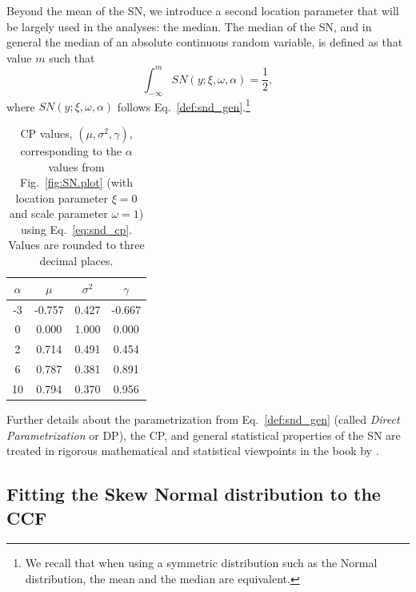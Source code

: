 \documentclass[11pt, oneside]{article}
\begin{document}
Beyond the mean of the SN, we introduce a second location parameter that will be largely used in the analyses: the median. The median of the SN, and in general the median of an absolute continuous random variable, is defined as that value $m$ such that 
%
\begin{equation} \label{eq:snmed}
\int_{-\infty}^{m} SN(y;\xi, \omega, \alpha) = \frac{1}{2},
\end{equation}
%
where $SN(y;\xi, \omega, \alpha)$ follows Eq.~\eqref{def:snd_gen}.\footnote{We recall that when using a symmetric distribution such as the Normal distribution, the mean and the median are equivalent.}

\begin{table}[htbp]
   \centering
   \begin{tabular}{|cccc|} %
\hline
$\alpha$ & $\mu$ & $\sigma^2$ & $\gamma$ \\
\hline
 -3 	&	 -0.757	&	 0.427	&	 -0.667 \\
0	&	 0.000 	&	1.000	&	 0.000 \\
2	&	 0.714	&	 0.491	&	 0.454\\
6	&	 0.787	&	 0.381	&	 0.891\\
10	&	 0.794	&	 0.370	&	 0.956\\
\hline
   \end{tabular}
   \caption{CP values, $(\mu, \sigma^2, \gamma)$, corresponding to the $\alpha$ values from Fig.~\ref{fig:SN.plot} (with location parameter $\xi = 0$ and scale parameter $\omega = 1$) using Eq.~\eqref{eq:snd_cp}.  Values are rounded to three decimal places.}
   \label{tab:cp_values}
\end{table}
%
Further details about the parametrization from Eq.~\eqref{def:snd_gen} (called \emph{Direct Parametrization} or DP), the CP, and general statistical properties of the SN are treated in rigorous mathematical and statistical viewpoints in the book by \cite{Azzalini2014}.

\subsection{Fitting the Skew Normal distribution to the CCF} \label{sec:3}
\end{document}
